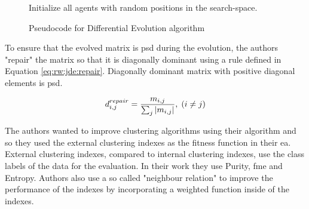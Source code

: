 \documentclass[12pt,a4paper]{report}
\begin{document}


\begin{figure}
\begin{algorithm}[H]
\DontPrintSemicolon
\LinesNumbered
{}
Initialize all agents with random positions in the search-space.\;
\end{algorithm} 
\caption{Pseudocode for Differential Evolution algorithm} \label{pseudo:de}
\end{figure}

To ensure that the evolved matrix is \ac{psd} during the evolution, the authors "repair" the matrix so that it is diagonally dominant using a rule defined in Equation \ref{eq:rw:jde:repair}. Diagonally dominant matrix with positive diagonal elements is \ac{psd}.

\begin{equation}
d_{i,j}^{repair} = \frac{m_{i,j}}{\sum_j \left|{m_{i,j}}\right|}, \; (i \neq j)
\label{eq:rw:jde:repair}
\end{equation}

The authors wanted to improve clustering algorithms using their algorithm and so they used the external clustering indexes as the fitness function in their \acl{ea}. External clustering indexes, compared to internal clustering indexes, use the class labels of the data for the evaluation. In their work they use Purity, \ac{fme} and Entropy. Authors also use a so called "neighbour relation" to improve the performance of the indexes by incorporating a weighted function inside of the indexes. 
\end{document}
